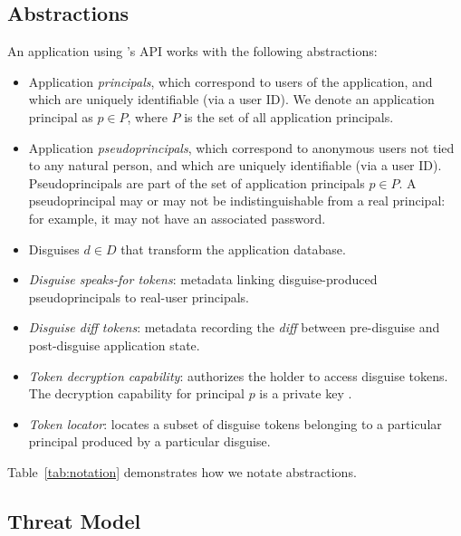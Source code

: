 \subsection{\sys Abstractions}
An application using \sys's API works with the following \sys abstractions:
\begin{itemize}
    \item Application \emph{principals}, which correspond to users of the application,
	and which are uniquely identifiable (\eg via a user ID).
	We denote an application principal as $p \in P$, where $P$ is the set of all application principals.
    \item Application \emph{pseudoprincipals}, which correspond to anonymous users not tied to any natural
    person, and which are uniquely identifiable (\eg via a user ID).
	Pseudoprincipals are part of the set of application principals $p \in P$.
    A pseudoprincipal may or may not be indistinguishable from a real principal: for example, it
        may not have an associated password.
    \item Disguises $d \in D$ %
        that transform the application database.
    \item \emph{Disguise speaks-for tokens}: metadata linking
        disguise-produced pseudoprincipals to real-user principals.
    \item \emph{Disguise diff tokens}: metadata recording the \emph{diff} between pre-disguise and
        post-disguise application state.
    \item \emph{Token decryption capability}: authorizes the holder to access disguise tokens.
        The decryption capability for principal $p$ is a private key .
    \item \emph{Token locator}: locates a subset of disguise tokens belonging to a particular
        principal produced by a particular disguise.
\end{itemize}
Table~\ref{tab:notation} demonstrates how we notate abstractions.

\subsection{Threat Model}
\label{s:threat}


